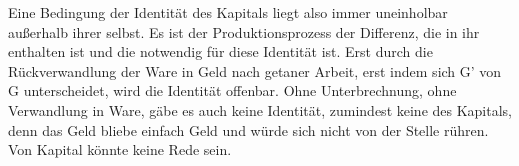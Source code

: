 \documentclass[12pt,
               DIV13,
               paper=a4,
               twoside=false,
               onehalfspacing,
               bibliography=totoc,
               toc=graduated,
               draft,
               ]{scrartcl}
\newcommand{\pc}[2]{\parencite[#1]{#2}}
\begin{document}
%
%
%
%


Eine Bedingung der Identität des Kapitals liegt also immer uneinholbar
außerhalb ihrer selbst. Es ist der Produktionsprozess der Differenz,
die in ihr enthalten ist und die notwendig für diese Identität ist.
Erst durch die Rückverwandlung der Ware in Geld nach \glq getaner
Arbeit\grq, erst indem sich G' von G unterscheidet, wird die Identität
offenbar. Ohne Unterbrechnung, ohne Verwandlung in Ware, gäbe es auch
keine Identität, zumindest keine des Kapitals, denn das Geld bliebe
einfach Geld und würde sich nicht von der Stelle rühren. Von Kapital
könnte keine Rede sein.


\end{document}
